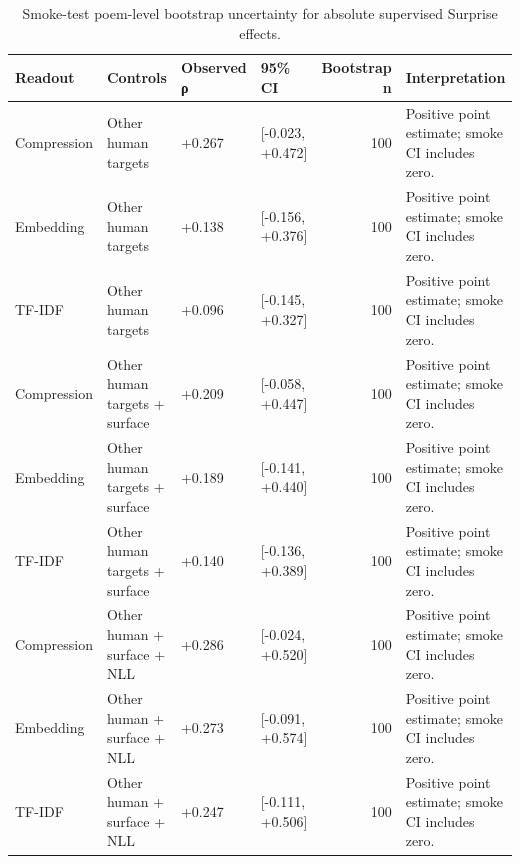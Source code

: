 \begin{table}
\caption{Smoke-test poem-level bootstrap uncertainty for absolute supervised Surprise effects.}
\label{tab:table_5_absolute_effect_uncertainty}
\begin{tabular}{llllrl}
\toprule
Readout & Controls & Observed ρ & 95\% CI & Bootstrap n & Interpretation \\
\midrule
Compression & Other human targets & +0.267 & [-0.023, +0.472] & 100 & Positive point estimate; smoke CI includes zero. \\
Embedding & Other human targets & +0.138 & [-0.156, +0.376] & 100 & Positive point estimate; smoke CI includes zero. \\
TF-IDF & Other human targets & +0.096 & [-0.145, +0.327] & 100 & Positive point estimate; smoke CI includes zero. \\
Compression & Other human targets + surface & +0.209 & [-0.058, +0.447] & 100 & Positive point estimate; smoke CI includes zero. \\
Embedding & Other human targets + surface & +0.189 & [-0.141, +0.440] & 100 & Positive point estimate; smoke CI includes zero. \\
TF-IDF & Other human targets + surface & +0.140 & [-0.136, +0.389] & 100 & Positive point estimate; smoke CI includes zero. \\
Compression & Other human + surface + NLL & +0.286 & [-0.024, +0.520] & 100 & Positive point estimate; smoke CI includes zero. \\
Embedding & Other human + surface + NLL & +0.273 & [-0.091, +0.574] & 100 & Positive point estimate; smoke CI includes zero. \\
TF-IDF & Other human + surface + NLL & +0.247 & [-0.111, +0.506] & 100 & Positive point estimate; smoke CI includes zero. \\
\bottomrule
\end{tabular}
\end{table}
